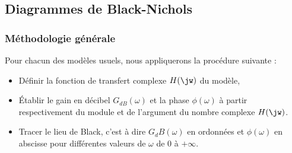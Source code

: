 %    
\clearpage

\captionsetup{width=0.9\linewidth}
\subsection{Diagrammes de Black-Nichols}
\subsubsection{Méthodologie générale}
Pour chacun des modèles usuels, nous appliquerons la procédure suivante :
\begin{itemize}
    \item Définir la fonction de transfert complexe $H(\jw)$ du modèle,
    \item \'Etablir le gain en décibel $G_{dB}(\omega)$ et 
          la phase $\phi(\omega)$ à partir 
          respectivement du module et de l'argument du nombre complexe $H(\jw)$.
    \item Tracer le lieu de Black, c'est à dire $G_dB(\omega)$ en ordonnées 
          et $\phi(\omega)$ en abscisse pour différentes valeurs de $\omega$ 
          de 0 à $+\infty$. 
\end{itemize}

